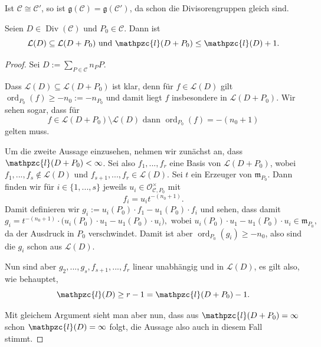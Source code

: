 \documentclass[a4paper,12pt,index=toc]{scrbook}
\theoremstyle{keinenummern} %
\def\CC{\mathcal{C}}
\def\O{\mathcal{O}}
\newcommand{\g}{\mathfrak{g}}
\renewcommand{\L}{\mathcal{L}}
\def\ll{\mathpzc{l}}
\def\m{\mathfrak{m}}
\newcommand{\Div}{\operatorname{Div}}
\newcommand{\ord}{\operatorname{ord}}
\renewcommand{\dotsc}{\ensuremath{\!...}}
\begin{document}
\begin{bem}\label{4.3.4}
Ist $\CC\cong\CC'$, so ist $\g(\CC)=\g(\CC')$, da schon die Divisorengruppen gleich sind.
\end{bem}

\begin{lem}\label{4.3.5}
Seien $D\in\Div(\CC)$ und $P_{0}\in\CC$. Dann ist
\begin{equation*}\L(D)\subseteq\L(D+P_{0})\text{ und }\ll(D+P_{0})\leq\ll(D)+1.\end{equation*}
\end{lem}

\begin{proof}
Sei $D:=\sum\limits_{P\in\CC}n_{P}P$.

Dass $\L(D)\subseteq\L(D+P_{0})$ ist klar, denn für $f\in\L(D)$ gilt $\ord_{P_{0}}(f)\geq-n_{0}:=-n_{P_{0}}$ und damit liegt $f$ insbesondere in $\L(D+P_{0})$. Wir sehen sogar, dass für 
\begin{equation*}f\in\L(D+P_{0})\setminus\L(D)\text{ dann }\ord_{P_{0}}(f)=-(n_{0}+1)\end{equation*} 
gelten muss.

Um die zweite Aussage einzusehen, nehmen wir zunächst an, dass $\ll(D+P_{0})<\infty$. Sei also $f_{1},\dotsc,f_{r}$ eine Basis von $\L(D+P_{0})$, wobei $f_{1},\dotsc,f_{s}\notin\L(D)$ und $f_{s+1},\dotsc,f_{r}\in\L(D)$. Sei $t$ ein Erzeuger von $\m_{P_{0}}$. Dann finden wir für $i\in\{1,\dotsc,s\}$ jeweils $u_{i}\in\O_{\CC,P_{0}}^{\times}$ mit 
\begin{equation*}f_{i}=u_{i}t^{-(n_{0}+1)}.\end{equation*}
Damit definieren wir $g_{i}:=u_{i}(P_{0})\cdot f_{1}-u_{1}(P_{0})\cdot f_{i}$ und sehen, dass damit
\begin{equation*}g_{i} = t^{-(n_{0}+1)}\cdot\bigl(u_{i}(P_{0})\cdot u_{1}-u_{1}(P_{0})\cdot u_{i}\bigr),\text{ wobei }u_{i}(P_{0})\cdot u_{1}-u_{1}(P_{0})\cdot u_{i}\in\m_{P_{0}},\end{equation*}
da der Ausdruck in $P_{0}$ verschwindet. Damit ist aber $\ord_{P_{0}}(g_{i})\geq-n_{0}$, also sind die $g_{i}$ schon aus $\L(D)$.

Nun sind aber $g_{2},\dotsc,g_{s},f_{s+1},\dotsc,f_{r}$ linear unabhängig und in $\L(D)$, es gilt also, wie behauptet,
\begin{equation*}\ll(D)\geq r-1=\ll(D+P_{0})-1.\end{equation*}

Mit gleichem Argument sieht man aber nun, dass aus $\ll(D+P_{0})=\infty$ schon $\ll(D)=\infty$ folgt, die Aussage also auch in diesem Fall stimmt.
\end{proof}
\end{document}
